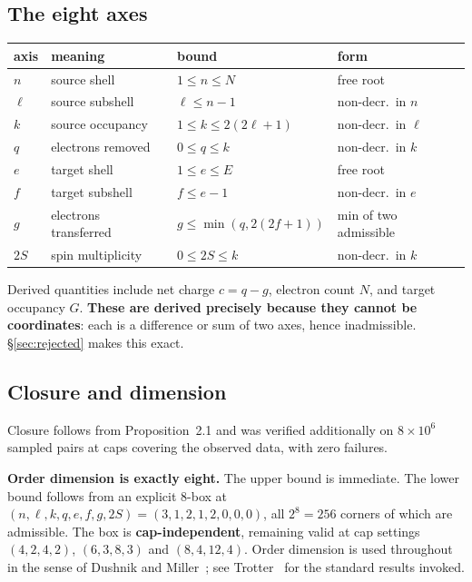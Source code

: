 \documentclass[11pt,a4paper]{article}
\theoremstyle{definition}
\begin{document}
\subsection{The eight axes}
\begin{center}\small
\begin{tabular}{@{}llll@{}}
\toprule
axis & meaning & bound & form\\
\midrule
$n$    & source shell          & $1\le n\le N$              & free root\\
$\ell$ & source subshell       & $\ell \le n-1$             & non-decr.\ in $n$\\
$k$    & source occupancy      & $1\le k\le 2(2\ell+1)$     & non-decr.\ in $\ell$\\
$q$    & electrons removed     & $0\le q\le k$              & non-decr.\ in $k$\\
$e$    & target shell          & $1\le e\le E$              & free root\\
$f$    & target subshell       & $f\le e-1$                 & non-decr.\ in $e$\\
$g$    & electrons transferred & $g\le\min(q,2(2f+1))$      & min of two admissible\\
$2S$   & spin multiplicity     & $0\le 2S\le k$             & non-decr.\ in $k$\\
\bottomrule
\end{tabular}
\end{center}
\vspace{2mm}

Derived quantities include net charge $c=q-g$, electron count $N$, and target
occupancy $G$. \textbf{These are derived precisely because they cannot be
coordinates}: each is a difference or sum of two axes, hence inadmissible.
\S\ref{sec:rejected} makes this exact.

\subsection{Closure and dimension}
Closure follows from Proposition~2.1 and was verified additionally on
$8\times10^{6}$ sampled pairs at caps covering the observed data, with zero
failures.

\textbf{Order dimension is exactly eight.} The upper bound is immediate. The
lower bound follows from an explicit 8-box at
$(n,\ell,k,q,e,f,g,2S)=(3,1,2,1,2,0,0,0)$, all $2^{8}=256$ corners of which are
admissible. The box is \textbf{cap-independent}, remaining valid at cap settings
$(4,2,4,2)$, $(6,3,8,3)$ and $(8,4,12,4)$. Order dimension is used throughout in
the sense of Dushnik and Miller~\cite{dushnik}; see Trotter~\cite{trotter} for
the standard results invoked.
\end{document}
